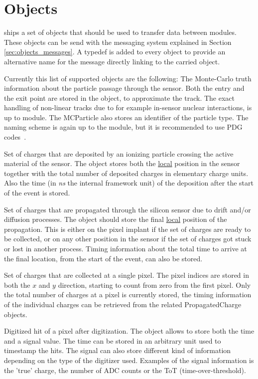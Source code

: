 \section{Objects}
\label{sec:objects}
\apsq ships a set of objects that should be used to transfer data between modules. These objects can be send with the messaging system explained in Section \ref{sec:objects_messages}. A typedef is added to every object to provide an alternative name for the message directly linking to the carried object.

Currently this list of supported objects are the following:
The Monte-Carlo truth information about the particle passage through the sensor. Both the entry and the exit point are stored in the object, to approximate the track. The exact handling of non-linear tracks due to for example in-sensor nuclear interactions, is up to module. The MCParticle also stores an identifier of the particle type. The naming scheme is again up to the module, but it is recommended to use PDG codes~\cite{pdg}.

Set of charges that are deposited by an ionizing particle crossing the active material of the sensor. The object stores both the \underline{local} position in the sensor together with the total number of deposited charges in elementary charge units. Also the time (in \textit{ns} the internal framework unit) of the deposition after the start of the event is stored.

Set of charges that are propagated through the silicon sensor due to drift and/or diffusion processes. The object should store the final \underline{local} position of the propagation. This is either on the pixel implant if the set of charges are ready to be collected, or on any other position in the sensor if the set of charges got stuck or lost in another process. Timing information about the total time to arrive at the final location, from the start of the event, can also be stored.

Set of charges that are collected at a single pixel. The pixel indices are stored in both the $x$ and $y$ direction, starting to count from zero from the first pixel. Only the total number of charges at a pixel is currently stored, the timing information of the individual charges can be retrieved from the related PropagatedCharge objects.

Digitized hit of a pixel after digitization. The object allows to store both the time and a signal value. The time can be stored in an arbitrary unit used to timestamp the hits. The signal can also store different kind of information depending on the type of the digitizer used. Examples of the signal information is the 'true' charge, the number of ADC counts or the ToT (time-over-threshold).
